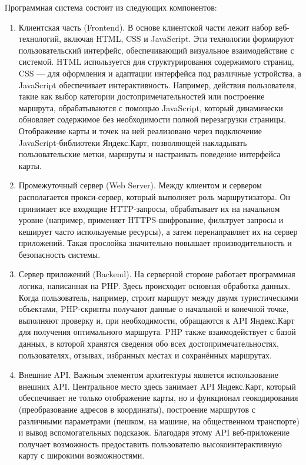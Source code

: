Программная система состоит из следующих компонентов:
\begin{enumerate}
	\item  Клиентская часть (Frontend). В основе клиентской части лежит набор веб-технологий, включая HTML, CSS и JavaScript. Эти технологии формируют пользовательский интерфейс, обеспечивающий визуальное взаимодействие с системой. HTML используется для структурирования содержимого страниц, CSS — для оформления и адаптации интерфейса под различные устройства, а JavaScript обеспечивает интерактивность. Например, действия пользователя, такие как выбор категории достопримечательностей или построение маршрута, обрабатываются с помощью JavaScript, который динамически обновляет содержимое без необходимости полной перезагрузки страницы. Отображение карты и точек на ней реализовано через подключение JavaScript-библиотеки Яндекс.Карт, позволяющей накладывать пользовательские метки, маршруты и настраивать поведение интерфейса карты.
	\item Промежуточный сервер (Web Server). Между клиентом и сервером располагается прокси-сервер, который выполняет роль маршрутизатора. Он принимает все входящие HTTP-запросы, обрабатывает их на начальном уровне (например, применяет HTTPS-шифрование, фильтрует запросы и кеширует часто используемые ресурсы), а затем перенаправляет их на сервер приложений. Такая прослойка значительно повышает производительность и безопасность системы.
	\item Сервер приложений (Backend). На серверной стороне работает программная логика, написанная на PHP. Здесь происходит основная обработка данных. Когда пользователь, например, строит маршрут между двумя туристическими объектами, PHP-скрипты получают данные о начальной и конечной точке, выполняют проверку и, при необходимости, обращаются к API Яндекс.Карт для получения оптимального маршрута. PHP также взаимодействует с базой данных, в которой хранятся сведения обо всех достопримечательностях, пользователях, отзывах, избранных местах и сохранённых маршрутах.
	\item Внешние API. Важным элементом архитектуры является использование внешних API. Центральное место здесь занимает API Яндекс.Карт, который обеспечивает не только отображение карты, но и функционал геокодирования (преобразование адресов в координаты), построение маршрутов с различными параметрами (пешком, на машине, на общественном транспорте) и вывод вспомогательных подсказок. Благодаря этому API веб-приложение получает возможность предоставить пользователю высокоинтерактивную карту с широкими возможностями.
\end{enumerate}

